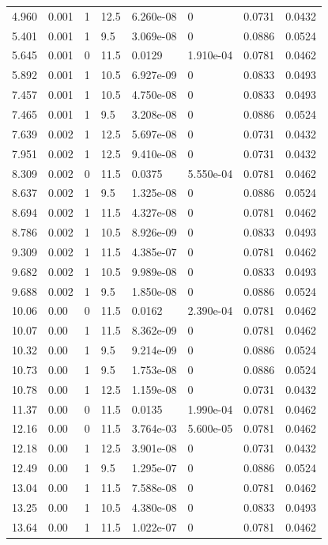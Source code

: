 \documentclass[preview]{standalone}
\begin{document}
{{\begin{tabular}{L{1.2cm}C{1.2cm} C{0.3cm}C{0.5cm} C{1.4cm}C{1.4cm} C{1.4cm}C{1.4cm}}
  4.960  &  0.001  & 1     & 12.5 &  6.260e-08  & 0  & 0.0731 &  0.0432   \\ 
  5.401  &  0.001  & 1     & 9.5 &  3.069e-08  & 0  & 0.0886 &  0.0524   \\ 
  5.645  &  0.001  & 0     & 11.5 &  0.0129  & 1.910e-04  & 0.0781 &  0.0462   \\ 
  5.892  &  0.001  & 1     & 10.5 &  6.927e-09  & 0  & 0.0833 &  0.0493   \\ 
  7.457  &  0.001  & 1     & 10.5 &  4.750e-08  & 0  & 0.0833 &  0.0493   \\ 
  7.465  &  0.001  & 1     & 9.5 &  3.208e-08  & 0  & 0.0886 &  0.0524   \\ 
  7.639  &  0.002  & 1     & 12.5 &  5.697e-08  & 0  & 0.0731 &  0.0432   \\ 
  7.951  &  0.002  & 1     & 12.5 &  9.410e-08  & 0  & 0.0731 &  0.0432   \\ 
  8.309  &  0.002  & 0     & 11.5 &  0.0375  & 5.550e-04  & 0.0781 &  0.0462   \\ 
  8.637  &  0.002  & 1     & 9.5 &  1.325e-08  & 0  & 0.0886 &  0.0524   \\ 
  8.694  &  0.002  & 1     & 11.5 &  4.327e-08  & 0  & 0.0781 &  0.0462   \\ 
  8.786  &  0.002  & 1     & 10.5 &  8.926e-09  & 0  & 0.0833 &  0.0493   \\ 
  9.309  &  0.002  & 1     & 11.5 &  4.385e-07  & 0  & 0.0781 &  0.0462   \\ 
  9.682  &  0.002  & 1     & 10.5 &  9.989e-08  & 0  & 0.0833 &  0.0493   \\ 
  9.688  &  0.002  & 1     & 9.5 &  1.850e-08  & 0  & 0.0886 &  0.0524   \\ 
  10.06  &  0.00  & 0     & 11.5 &  0.0162  & 2.390e-04  & 0.0781 &  0.0462   \\ 
  10.07  &  0.00  & 1     & 11.5 &  8.362e-09  & 0  & 0.0781 &  0.0462   \\ 
  10.32  &  0.00  & 1     & 9.5 &  9.214e-09  & 0  & 0.0886 &  0.0524   \\ 
  10.73  &  0.00  & 1     & 9.5 &  1.753e-08  & 0  & 0.0886 &  0.0524   \\ 
  10.78  &  0.00  & 1     & 12.5 &  1.159e-08  & 0  & 0.0731 &  0.0432   \\ 
  11.37  &  0.00  & 0     & 11.5 &  0.0135  & 1.990e-04  & 0.0781 &  0.0462   \\ 
  12.16  &  0.00  & 0     & 11.5 &  3.764e-03  & 5.600e-05  & 0.0781 &  0.0462   \\ 
  12.18  &  0.00  & 1     & 12.5 &  3.901e-08  & 0  & 0.0731 &  0.0432   \\ 
  12.49  &  0.00  & 1     & 9.5 &  1.295e-07  & 0  & 0.0886 &  0.0524   \\ 
  13.04  &  0.00  & 1     & 11.5 &  7.588e-08  & 0  & 0.0781 &  0.0462   \\ 
  13.25  &  0.00  & 1     & 10.5 &  4.380e-08  & 0  & 0.0833 &  0.0493   \\ 
  13.64  &  0.00  & 1     & 11.5 &  1.022e-07  & 0  & 0.0781 &  0.0462   \\ 
\hline 
\end{tabular} 

}}
\end{document}
